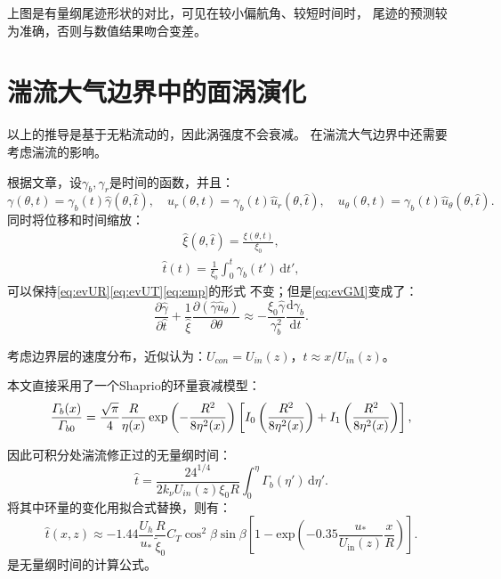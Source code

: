 \documentclass[UTF8,zihao=5]{ctexart} %
\begin{document}
上图是有量纲尾迹形状的对比，可见在较小偏航角、较短时间时，
尾迹的预测较为准确，否则与数值结果吻合变差。

\section{湍流大气边界中的面涡演化}

以上的推导是基于无粘流动的，因此涡强度不会衰减。
在湍流大气边界中还需要考虑湍流的影响。

根据文章，设$\gamma_b,\gamma_r$是时间的函数，并且：
\begin{equation} \gamma(\theta,t) = \gamma_b(t) \hat{\gamma}(\theta,\hat{t}),\quad {u}_r(\theta,t)= \gamma_b(t)\hat{u}_r(\theta,\hat{t}),\quad {u}_{\theta}(\theta,t)=\gamma_b(t) \hat{u}_{\theta}(\theta,\hat{t}). \end{equation}
同时将位移和时间缩放：
\begin{gather} \hat{\xi}(\theta,\hat{t})=\frac{\xi(\theta,t)}{\xi_0}, \end{gather}
\begin{gather}\hat{t}(t)=\frac{1}{\xi_0}\int_0^{t}\gamma_b(t')\,\textrm{d}t', \end{gather}
可以保持\eqref{eq:evUR}\eqref{eq:evUT}\eqref{eq:emp}的形式
不变；但是\eqref{eq:evGM}变成了：
\begin{equation} \frac{\partial \hat{\gamma}}{\partial \hat{t}}+\frac{1}{\hat{\xi}} \frac{\partial (\hat{\gamma} \hat{u}_\theta)}{\partial \theta}\approx{-} \frac{\xi_0\hat{\gamma}}{\gamma^{2}_b}\frac{\textrm{d} \gamma_b}{\textrm{d} t}. \end{equation}

考虑边界层的速度分布，近似认为：$U_{con}=U_{{in}}(z)$，$t \approx x/U_{{in}}(z)$。

本文直接采用了一个Shaprio的环量衰减模型：
\begin{equation} \frac{\varGamma_b(x)}{\varGamma_{b0}}=\frac{\sqrt{\rm \pi}}{4}\frac{R}{\eta(x)} \exp\left(-\frac{R^{2}}{8\eta^{2}(x)}\right)\left[I_0\left(\frac{R^{2}}{8\eta^{2}(x)}\right)+I_1 \left(\frac{R^{2}}{8\eta^{2}(x)}\right)\right], \end{equation}

因此可积分处湍流修正过的无量纲时间：
\begin{equation} \hat{t}=\frac{24^{1/4}}{2k_{\nu}U_{{in}}(z)\xi_0 R }\int_0^{\eta}\varGamma_b(\eta')\,\textrm{d}\eta'. \end{equation}
将其中环量的变化用拟合式替换，则有：
\begin{equation} \hat{t}(x,z)\approx{-}1.44 \frac{U_h}{u_*}\frac{R}{\tilde{\xi}_0} C_T \cos^{2}\beta \sin\beta \left[1-\textrm{exp}\left({-}0.35\frac{u_*}{U_\textrm{in}(z)}\frac{x}{R}\right)\right]. \end{equation}
是无量纲时间的计算公式。
\end{document}
